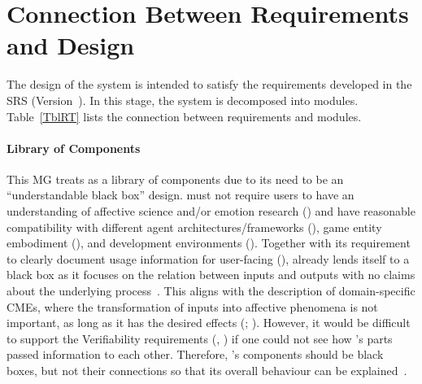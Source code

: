 \section{Connection Between Requirements and Design} \label{SecConnection}

The design of the system is intended to satisfy the requirements developed in
the SRS (Version~\srsVersion). In this stage, the system is decomposed into
modules. Table~\ref{TblRT} lists the connection between requirements and
modules.

\paragraph{Library of Components}
This MG treats \progname{} as a library of components due to its need to be an 
``understandable black box'' design. \progname{} must not require users to have 
an understanding of affective science and/or emotion research 
() and have reasonable compatibility with different agent 
architectures/frameworks (), game entity embodiment 
(), and development environments (). Together with 
its requirement to clearly document usage information for user-facing 
(), \progname{} already lends itself to a black box as it 
focuses on the relation between inputs and outputs with no claims about the 
underlying process~\citep[p.~601]{wehrle1995potential}. This aligns with the 
description of domain-specific CMEs, where the transformation of inputs into 
affective phenomena is not important, as long as it has the desired effects 
(; 
). However, it would be difficult to 
support the Verifiability requirements (, ) if 
one could not see how \progname{}'s parts passed information to each other. 
Therefore, \progname{}'s components should be black boxes, but not their 
connections so that its overall behaviour can be 
explained~\citep[p.~20]{guimaraes2022fatima}.

